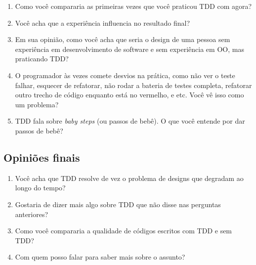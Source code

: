 \begin{enumerate}
	\item Como você compararia as primeiras vezes que você praticou TDD com agora?

	\item Você acha que a experiência influencia no resultado final?

	\item Em sua opinião, como você acha que seria o design de uma pessoa sem
	experiência em desenvolvimento de software e sem experiência em OO, mas praticando TDD?

	\item O programador às vezes comete desvios na prática, como não ver o teste
	falhar,  esquecer de refatorar, não rodar a bateria de testes completa,
	refatorar outro trecho de código enquanto está no vermelho, e etc. Você vê isso
	como um problema?
	
	\item TDD fala sobre \textit{baby steps} (ou passos de bebê). O que você 
	entende por dar passos de bebê?

\end{enumerate}

\subsection{Opiniões finais}

\begin{enumerate}
	\item Você acha que TDD resolve de vez o problema de designs que degradam ao longo do tempo?

	\item Gostaria de dizer mais algo sobre TDD que não disse nas perguntas anteriores?
	
	\item Como você compararia a qualidade de códigos escritos com TDD e sem TDD? 

	\item Com quem posso falar para saber mais sobre o assunto?
\end{enumerate}
